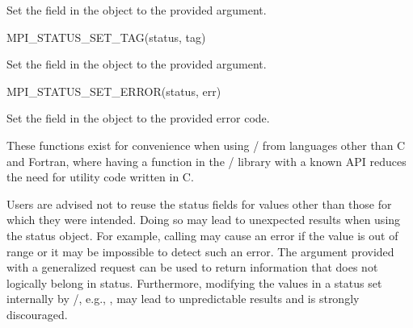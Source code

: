 Set the  field in the  object to the provided  argument.

%
\begin{funcdef}{MPI\_STATUS\_SET\_TAG}{(\mbox{status}, \mbox{tag})}
\end{funcdef}

Set the  field in the  object to the provided  argument.

%
\begin{funcdef}{MPI\_STATUS\_SET\_ERROR}{(\mbox{status}, \mbox{err})}
\end{funcdef}

Set the  field in the  object to the provided  error code.

\begin{rationale}
These functions exist for convenience when using \mpi/ from languages
other than C and Fortran, where having a function in the \mpi/ library
with a known API reduces the need for utility code written in C.
\end{rationale}

\begin{users}
Users are advised not to reuse the status fields for values other than
those for which they were intended.  Doing so may lead to unexpected
results when using the status object.  For example, calling
 may cause an error if the value is
out of range or it may be impossible to detect such an error.  The
 argument provided with a generalized request can
be used to return information that does not logically belong in
status.
Furthermore, modifying the values in a status set internally by \MPI/,
e.g., , may lead to unpredictable results and is
strongly discouraged.
\end{users}


